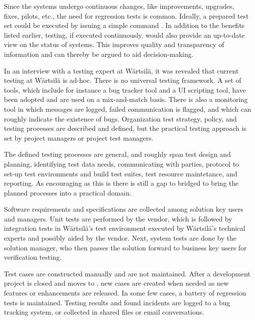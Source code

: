 \documentclass[12pt,a4paper,oneside,pdftex]{report}
\begin{document}
Since the systems undergo continuous changes, like improvements, upgrades, fixes, pilots, etc., the need for regression tests is common. Ideally, a prepared test set could be executed by issuing a simple command \citep{duvall2007continuous}. In addition to the benefits listed earlier, testing, if executed continuously, would also provide an up-to-date view on the status of systems. This improves quality and transparency of information and can thereby be argued to aid decision-making.

In an interview with a testing expert at Wärtsilä, it was revealed that current testing at Wärtsilä is ad-hoc. There is no universal testing framework. A set of tools, which include for instance a bug tracker tool and a UI scripting tool, have been adopted and are used on a mix-and-match basis. There is also a monitoring tool in which messages are logged, failed communication is flagged, and which can roughly indicate the existence of bugs. Organization test strategy, policy, and testing processes are described and defined, but the practical testing approach is set by project managers or project test managers. 

The defined testing processes are general, and roughly span test design and planning, identifying test data needs, communicating with parties, protocol to set-up test environments and build test suites, test resource maintetance, and reporting. As encouraging as this is there is still a gap to bridged to bring the planned processes into a practical domain. 


Software requirements and specifications are collected among solution key users and managers. Unit tests are performed by the vendor, which is followed by integration tests in Wärtsilä's test environment executed by Wärtsilä's technical experts and possibly aided by the vendor. Next, system tests are done by the solution manager, who then passes the solution forward to business key users for verification testing. %

Test cases are constructed manually and are not maintained. After a development project is closed and moves to , new cases are created when needed as new features or enhancements are released. In some few cases, a battery of regression tests is maintained. Testing results and found incidents are logged to a bug tracking system, or collected in shared files or email conversations. 
\end{document}

